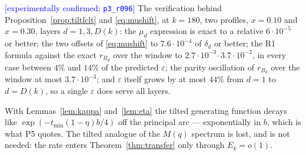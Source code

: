 \documentclass[11pt,a4paper]{article}
\theoremstyle{plain}
\theoremstyle{definition}
\theoremstyle{remark}
\newcommand{\STATUS}[1]{\textcolor{blue}{\textsf{[#1]}}}
\begin{document}
\noindent
\STATUS{experimentally confirmed; \texttt{p3\_r096}} The verification behind
Proposition~\ref{prop:tiltlclt} and \eqref{eq:mushift}, at $k=180$, two profiles,
$x=0.10$ and $x=0.30$, layers $d=1,3,D(k)$: the $\mu_d$ expression is exact to a relative
$6\cdot10^{-5}$ or better; the two offsets of \eqref{eq:mushift} to $7.6\cdot10^{-4}$ of
$\delta_d$ or better; the R1 formula against the exact $r_{B_d}$ over the window to
$2.7\cdot10^{-3}$--$3.7\cdot10^{-2}$, in every case between $4\%$ and $14\%$ of the predicted
$\varepsilon$; the parity oscillation of $r_{B_d}$ over the window at most
$3.7\cdot10^{-3}$; and $\varepsilon$ itself grows by at most $44\%$ from $d=1$ to $d=D(k)$, so
a single $\varepsilon$ does serve all layers.

\noindent
With Lemmas~\ref{lem:kappa} and~\ref{lem:eta} the tilted generating function decays like
$\exp(-t_{\min}(1-\eta)b/4)$ off the principal arc --- exponentially in $b$, which is what P5
quotes. The tilted analogue of the $M(q)$ spectrum is lost, and is not needed: the rate enters
Theorem~\ref{thm:transfer} only through $E_k=o(1)$.
\end{document}
